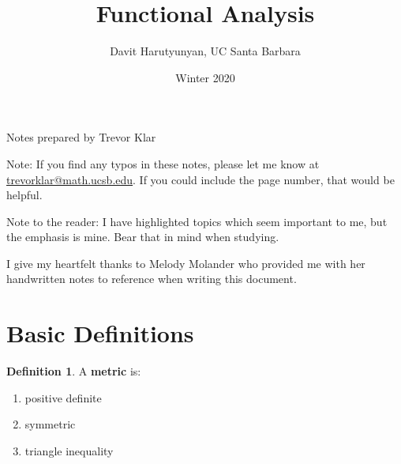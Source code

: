\documentclass[a5paper]{article}
\title{Functional Analysis}
\author{Davit Harutyunyan, UC Santa Barbara}
\date{Winter 2020}
\theoremstyle{definition}%
\newtheorem*{definition*}{Definition}
\numberwithin{exercise}{section}
\theoremstyle{remark}%
\begin{document}
\maketitle

\begin{center}
Notes prepared by Trevor Klar
\end{center}
\tableofcontents



\begin{highlight}
Note: If you find any typos in these notes, please let me know at \\ \href{mailto:trevorklar@math.ucsb.edu}{trevorklar@math.ucsb.edu}. If you could include the page number, that would be helpful. 

Note to the reader: I have highlighted topics which seem important to me, but the emphasis is mine. Bear that in mind when studying. 

I give my heartfelt thanks to Melody Molander who provided me with her handwritten notes to reference when writing this document.
\end{highlight}

\renewcommand{\emph}{\textbf}
\setcounter{section}{-1}
\section{Basic Definitions}

\begin{definition*}
A \emph{metric} is: 
\begin{enumerate}
	\item positive definite
	\item symmetric
	\item triangle inequality
\end{enumerate}
\end{definition*}
\end{document}
